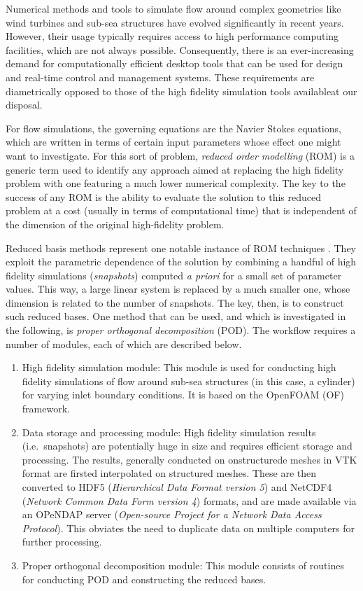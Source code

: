 \documentclass[3p,times,procedia]{elsarticle}
\begin{document}
Numerical methods and tools to simulate flow around complex geometries like wind
turbines and sub-sea structures have evolved significantly in recent years.
However, their usage typically requires access to high performance computing
facilities, which are not always possible. Consequently, there is an
ever-increasing demand for computationally efficient desktop tools that can be
used for design and real-time control and management systems. These requirements
are diametrically opposed to those of the high fidelity simulation tools
availableat our disposal.

For flow simulations, the governing equations are the Navier Stokes equations,
which are written in terms of certain input parameters whose effect one might
want to investigate. For this sort of problem, \emph{reduced order modelling}
(ROM) is a generic term used to identify any approach aimed at replacing the
high fidelity problem with one featuring a much lower numerical complexity. The
key to the success of any ROM is the ability to evaluate the solution to this
reduced problem at a cost (usually in terms of computational time) that is
independent of the dimension of the original high-fidelity problem.

Reduced basis methods represent one notable instance of ROM techniques
\cite{Quarteroni2014rom}. They exploit the parametric dependence of the solution
by combining a handful of high fidelity simulations (\emph{snapshots}) computed
\emph{a priori} for a small set of parameter values. This way, a large linear
system is replaced by a much smaller one, whose dimension is related to the
number of snapshots. The key, then, is to construct such reduced bases. One
method that can be used, and which is investigated in the following, is
\emph{proper orthogonal decomposition} (POD). The workflow requires a number of
modules, each of which are described below.

\begin{enumerate}
\item High fidelity simulation module: This module is used for conducting high
  fidelity simulations of flow around sub-sea structures (in this case, a
  cylinder) for varying inlet boundary conditions. It is based on the OpenFOAM
  (OF) framework.
\item Data storage and processing module: High fidelity simulation results
  (i.e.~snapshots) are potentially huge in size and requires efficient storage
  and processing. The results, generally conducted on onstructurede meshes in
  VTK format are firsted interpolated on structured meshes. These are then
  converted to HDF5 (\emph{Hierarchical Data Format version 5}) and NetCDF4
  (\emph{Network Common Data Form version 4}) formats, and are made available
  via an OPeNDAP server (\emph{Open-source Project for a Network Data Access
    Protocol}). This obviates the need to duplicate data on multiple computers
  for further processing.
\item Proper orthogonal decomposition module: This module consists of routines
  for conducting POD and constructing the reduced bases.
\end{enumerate}
\end{document}
